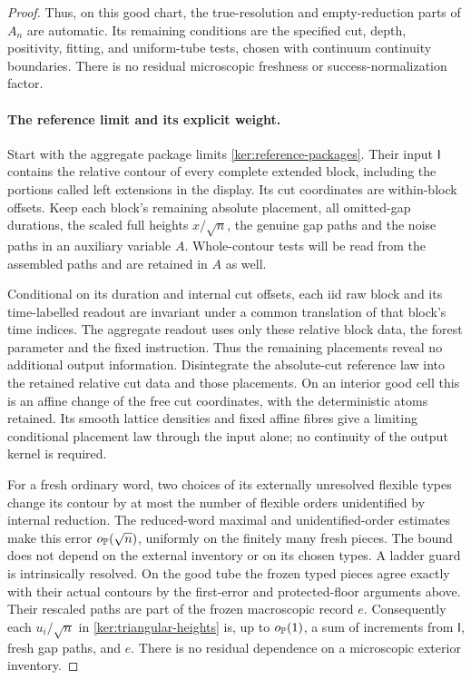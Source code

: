 \begin{proof}
Thus, on this good chart, the true-resolution and empty-reduction
parts of \(A_n\) are automatic.  Its remaining conditions are the
specified cut, depth, positivity, fitting, and uniform-tube tests,
chosen with continuum continuity boundaries.  There is no residual
microscopic freshness or success-normalization factor.

\paragraph{The reference limit and its explicit weight.}
Start with the aggregate package limits
\eqref{ker:reference-packages}. Their input \(\mathsf I\) contains the
relative contour of every complete extended block, including the
portions called left extensions in the display. Its cut coordinates
are within-block offsets. Keep each block's remaining absolute
placement, all omitted-gap durations, the scaled full heights
\(x/\sqrt n\), the genuine gap paths and the noise paths in an
auxiliary variable \(A\). Whole-contour tests will be read from the
assembled paths and are retained in \(A\) as well.

Conditional on its duration and internal cut offsets, each iid raw
block and its time-labelled readout are invariant under a common
translation of that block's time indices. The aggregate readout uses
only these relative block data, the forest parameter and the fixed
instruction. Thus the remaining placements reveal no additional
output information. Disintegrate the absolute-cut reference law into
the retained relative cut data and those placements. On an interior
good cell this is an affine change of the free cut coordinates, with
the deterministic atoms retained. Its smooth lattice densities and
fixed affine fibres give a limiting conditional placement law through
the input alone; no continuity of the output kernel is required.

For a fresh ordinary word, two choices of its externally unresolved
flexible types change its contour by at most the number of flexible
orders unidentified by internal reduction. The reduced-word maximal
and unidentified-order estimates
\cite[Lemma~3.13]{SheffieldInventory}
\cite[Lemma~3.7]{GwynneMaoSunFKI} make this error
\(o_{\mathbb P}(\sqrt n)\), uniformly on the finitely many fresh pieces.
The bound does not depend on the external inventory or on its chosen
types. A ladder guard is intrinsically resolved. On the good tube the
frozen typed pieces agree exactly with their actual contours by the
first-error and protected-floor arguments above. Their rescaled paths
are part of the frozen macroscopic record \(e\).
Consequently each \(u_i/\sqrt n\) in
\eqref{ker:triangular-heights} is, up to \(o_{\mathbb P}(1)\), a sum of
increments from \(\mathsf I\), fresh gap paths, and \(e\).
There is no residual dependence on a microscopic exterior inventory.


\end{proof}
